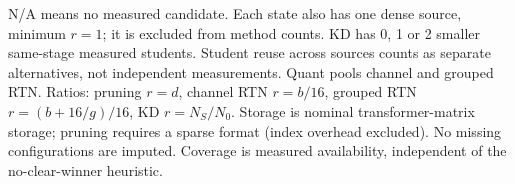 \begin{table}[H]
\begin{tabular}{lrrrrr}
\bottomrule
\end{tabular}
\par\smallskip
\begin{minipage}{\linewidth}\small
N/A means no measured candidate. Each state also has one dense source, minimum $r=1$; it is excluded from method counts. KD has 0, 1 or 2 smaller same-stage measured students. Student reuse across sources counts as separate alternatives, not independent measurements. Quant pools channel and grouped RTN. Ratios: pruning $r=d$, channel RTN $r=b/16$, grouped RTN $r=(b+16/g)/16$, KD $r=N_S/N_0$. Storage is nominal transformer-matrix storage; pruning requires a sparse format (index overhead excluded). No missing configurations are imputed. Coverage is measured availability, independent of the no-clear-winner heuristic.
\end{minipage}
\end{table}
